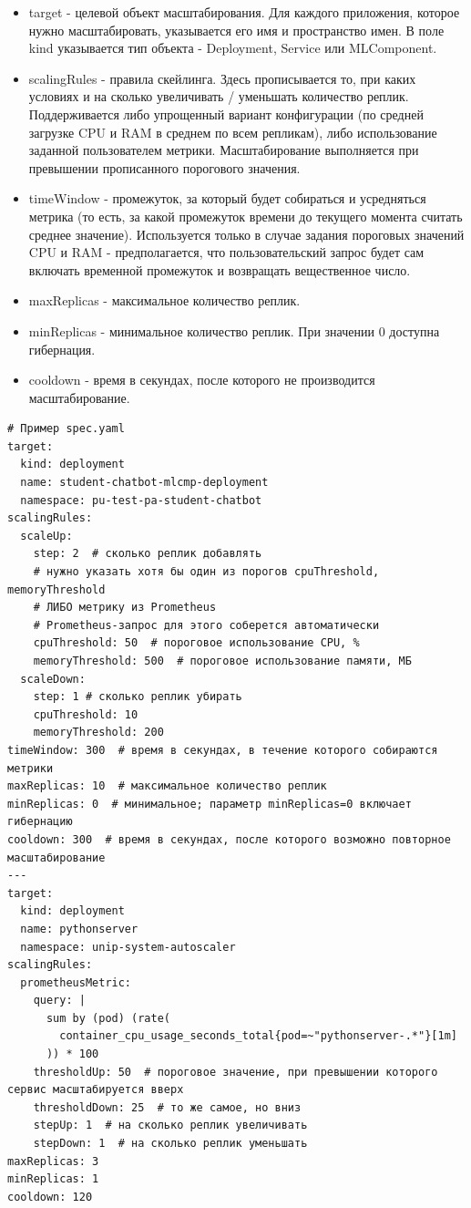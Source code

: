 \documentclass[a4paper]{article}
\begin{document}
\begin{itemize}
  \item target - целевой объект масштабирования. Для каждого
    приложения, которое нужно масштабировать, указывается его имя и
    пространство имен. В поле kind указывается тип объекта -
    Deployment, Service или MLComponent.
  \item scalingRules - правила скейлинга. Здесь прописывается то, при
    каких условиях и на сколько увеличивать / уменьшать количество реплик.
    Поддерживается либо упрощенный вариант конфигурации (по средней
    загрузке CPU и RAM в среднем по всем репликам), либо использование заданной
    пользователем метрики. Масштабирование выполняется при превышении
    прописанного порогового значения.
  \item timeWindow - промежуток, за который будет собираться и
    усредняться метрика (то есть, за какой промежуток времени до текущего
    момента считать среднее значение). Используется только в случае
    задания пороговых значений CPU и RAM - предполагается, что пользовательский
    запрос будет сам включать временной промежуток и возвращать вещественное
    число.
  \item maxReplicas - максимальное количество реплик.
  \item minReplicas - минимальное количество реплик. При значении 0 доступна
    гибернация.
  \item cooldown - время в секундах, после которого не производится
    масштабирование.
\end{itemize}

\begin{verbatim}
# Пример spec.yaml
target:
  kind: deployment
  name: student-chatbot-mlcmp-deployment
  namespace: pu-test-pa-student-chatbot
scalingRules:
  scaleUp:
    step: 2  # сколько реплик добавлять
    # нужно указать хотя бы один из порогов cpuThreshold, memoryThreshold
    # ЛИБО метрику из Prometheus
    # Prometheus-запрос для этого соберется автоматически
    cpuThreshold: 50  # пороговое использование CPU, %
    memoryThreshold: 500  # пороговое использование памяти, МБ
  scaleDown:
    step: 1 # сколько реплик убирать
    cpuThreshold: 10
    memoryThreshold: 200
timeWindow: 300  # время в секундах, в течение которого собираются метрики
maxReplicas: 10  # максимальное количество реплик
minReplicas: 0  # минимальное; параметр minReplicas=0 включает гибернацию
cooldown: 300  # время в секундах, после которого возможно повторное масштабирование
---
target:
  kind: deployment
  name: pythonserver
  namespace: unip-system-autoscaler
scalingRules:
  prometheusMetric:
    query: |
      sum by (pod) (rate(
        container_cpu_usage_seconds_total{pod=~"pythonserver-.*"}[1m]
      )) * 100
    thresholdUp: 50  # пороговое значение, при превышении которого сервис масштабируется вверх
    thresholdDown: 25  # то же самое, но вниз
    stepUp: 1  # на сколько реплик увеличивать
    stepDown: 1  # на сколько реплик уменьшать
maxReplicas: 3
minReplicas: 1
cooldown: 120
\end{verbatim}
\end{document}
